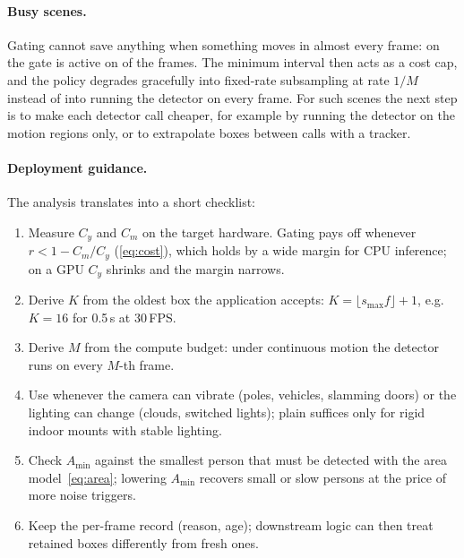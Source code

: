 \paragraph{Busy scenes.} Gating cannot save anything when something moves in almost every frame: on  the gate is active on \VtActiveFDS{} of the frames. The minimum interval then acts as a cost cap, and the policy degrades gracefully into fixed-rate subsampling at rate $1/M$ instead of into running the detector on every frame. For such scenes the next step is to make each detector call cheaper, for example by running the detector on the motion regions only, or to extrapolate boxes between calls with a tracker.

\paragraph{Deployment guidance.} The analysis translates into a short checklist:
\begin{enumerate}
\item Measure $C_y$ and $C_m$ on the target hardware. Gating pays off whenever $r<1-C_m/C_y$ (\cref{eq:cost}), which holds by a wide margin for CPU inference; on a GPU $C_y$ shrinks and the margin narrows.
\item Derive $K$ from the oldest box the application accepts: $K=\lfloor s_{\max}f\rfloor+1$, e.g.\ $K=16$ for 0.5\,s at 30\,FPS.
\item Derive $M$ from the compute budget: under continuous motion the detector runs on every $M$-th frame.
\item Use \FDS{} whenever the camera can vibrate (poles, vehicles, slamming doors) or the lighting can change (clouds, switched lights); plain \FD{} suffices only for rigid indoor mounts with stable lighting.
\item Check $A_{\min}$ against the smallest person that must be detected with the area model~\eqref{eq:area}; lowering $A_{\min}$ recovers small or slow persons at the price of more noise triggers.
\item Keep the per-frame record (reason, age); downstream logic can then treat retained boxes differently from fresh ones.
\end{enumerate}

